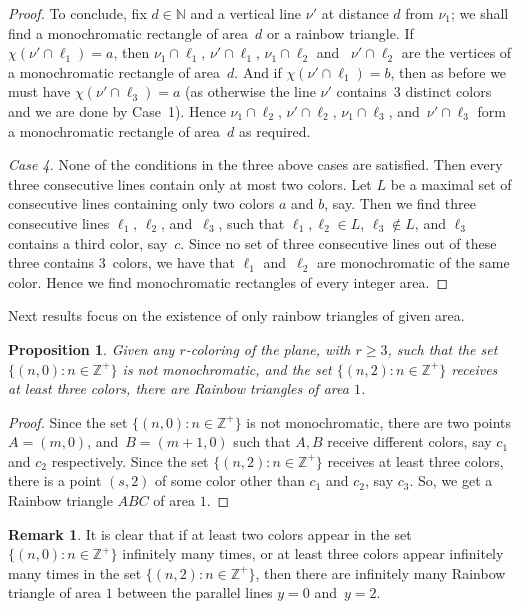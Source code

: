 \documentclass[a4paper, 11pt,reqno]{amsart}
\newtheorem{proposition}{Proposition}
\theoremstyle{definition}
\newtheorem{remark}{Remark}
\newcommand{\N}{\mbox{${\mathbb N}$}}
\newcommand{\Z}{\mbox{${\mathbb Z}$}}
\begin{document}
{\begin{proof}
      To conclude, fix $d\in\N$ and a vertical line $\nu'$ at distance $d$ from $\nu_1$;
      we shall find a monochromatic rectangle of area~$d$ or a rainbow triangle.
      If $\chi(\nu'\!\cap\ell_1)=a$, then $\nu_1\cap \ell_1,\,\nu'\!\cap \ell_1,\,\nu_1\cap \ell_2$ and
      ~$\nu'\!\cap \ell_2$ are the vertices
      of a monochromatic rectangle of area~$d$. And if $\chi(\nu'\cap \ell_1)=b$, then as before we must have $\chi(\nu'\cap \ell_3)=a$
      (as otherwise the line $\nu'$ contains~3 distinct colors and we are done by Case~1).
      Hence $\nu_1\cap\ell_2,\,\nu'\!\cap\ell_2,\,\nu_1\cap\ell_3$, and~$\nu'\!\cap\ell_3$ form a monochromatic rectangle of area~$d$ as required.

      \emph{Case 4.} None of the conditions in the three above cases are satisfied. Then every three consecutive lines contain only at most two colors.  Let $L$ be a maximal set of consecutive lines containing only two colors $a$ and $b$, say.  Then we find three consecutive lines $\ell_1,\,\ell_2$, and~$\ell_3$, such that $\ell_1,\ell_2\in L$, $\ell_3\not\in L$, and $\ell_3$ contains a third color, say~$c$. Since no set of three consecutive lines out of these three contains $3$~colors, we have that $\ell_1$ and~$\ell_2$ are monochromatic of the same color. Hence we find monochromatic rectangles of every integer area.
    \end{proof}
}


{Next results focus on the existence of only rainbow triangles of given area. }


\begin{proposition} \label{prop1} Given any $r$-coloring of the plane, with $r \geq 3$, such that the set
$\{(n,0): n \in \Z^+\}$ is not monochromatic, and the set $\{(n,2): n \in \Z^+\}$ receives at least three colors,
there are Rainbow triangles of area $1$.
\end{proposition}

\begin{proof} Since the set $\{(n,0): n \in \Z^+\}$ is not monochromatic, there are two points $A= (m,0)$, and~$B= (m+1, 0)$
such that $A,B$ receive different colors, say $c_1$ and $c_2$ respectively. Since
the set $\{(n,2): n \in \Z^+\}$ receives at least three colors, there is a point $(s,2)$ of some color other than
 $c_1$ and $c_2$, say $c_3$.
So, we get a Rainbow triangle $ABC$ of area $1$.
\end{proof}
\begin{remark}
It is clear that if at least two colors appear in
the set $\{(n,0): n \in \Z^+\}$ infinitely many times, or at least three colors appear infinitely many times in the set
$\{(n,2): n \in \Z^+\}$,
then there are infinitely many Rainbow triangle  of area $1$ between the parallel lines $y=0$ and~$y=2$.
\end{remark}
\end{document}
